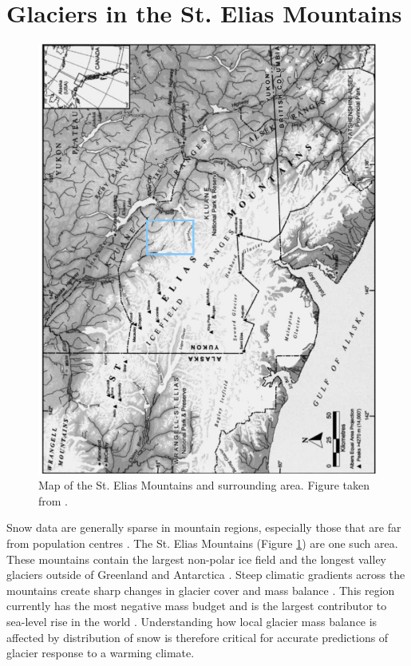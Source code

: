 \documentclass{sfuthesis}
\begin{document}
\section{Glaciers in the St. Elias Mountains}
\begin{figure}
 \centering
      \includegraphics[width=\textwidth]{stelias.png}
  \caption{Map of the St. Elias Mountains and surrounding area. Figure taken from \cite{Danby2003}.}
        \label{map}
\end{figure}

Snow data are generally sparse in mountain regions, especially those that are far from population centres \citep{Marcus1970}. The St. Elias Mountains (Figure \ref{map}) are one such area. These mountains contain the largest non-polar ice field and the longest valley glaciers outside of Greenland and Antarctica \citep{Marcus1970, Danby2003}. Steep climatic gradients across the mountains create sharp changes in glacier cover and mass balance \citep{Clarke2002}. This region currently has the most negative mass budget and is the largest contributor to sea-level rise in the world \citep{Kaser2006, Gardner2013}. Understanding how local glacier mass balance is affected by distribution of snow is therefore critical for accurate predictions of glacier response to a warming climate. 
\end{document}
